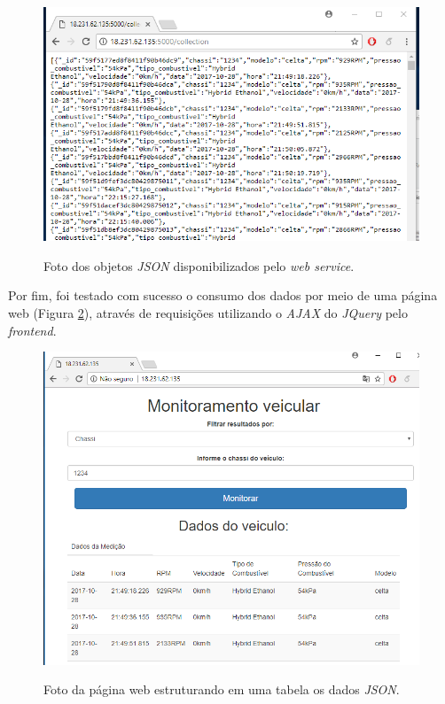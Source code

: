 \begin{figure}[!ht]
\centering
\caption{Foto dos objetos \textit{JSON} disponibilizados pelo \textit{web service}.} 
{\includegraphics[scale=.68]{imagens/JSON_retornoWebservice.png}}\\
 \label{Fig:json_retorno_web}
\end{figure}

Por fim, foi testado com sucesso o consumo dos dados por meio de uma página web (Figura \ref{Fig:pagina_web_tabela_dados}), através de requisições utilizando o \textit{AJAX} do \textit{JQuery} pelo \textit{frontend}.

\begin{figure}[!ht]
\centering
\caption{Foto da página web estruturando em uma tabela os dados \textit{JSON}.} 
{\includegraphics[scale=.68]{imagens/paginaweb_tabelaDados.png}}\\
 \label{Fig:pagina_web_tabela_dados}
\end{figure}